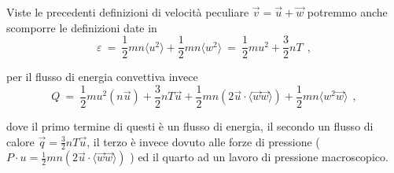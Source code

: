 \vspace{0.3cm}
Viste le precedenti definizioni di velocità peculiare $\vec v = \vec u + \vec w$ potremmo anche scomporre le definizioni date in 
\[\varepsilon\ =\ \frac{1}{2} m n \langle u^2\rangle + \frac{1}{2} m n \langle w^2\rangle\ =\ \frac{1}{2} m u^2 + \frac{3}{2} n T\ \ ,\] 

per il flusso di energia convettiva invece 
\[Q\ =\ \frac{1}{2} m u^2 (n\vec u) + \frac{3}{2} n T\vec u +\frac{1}{2} m n (2\vec u\cdot \langle \vec w \vec w \rangle) +\frac{1}{2}mn\langle w^2\vec w\rangle\ \ ,\]

dove il primo termine di questi è un flusso di energia, il secondo un flusso di calore $\vec q = \frac{3}{2} n T\vec u$, il terzo è invece dovuto alle forze di pressione ( $P\cdot u = \frac{1}{2} mn(2\vec u\cdot \langle \vec w \vec w\rangle )$ ) ed il quarto ad un lavoro di pressione macroscopico.